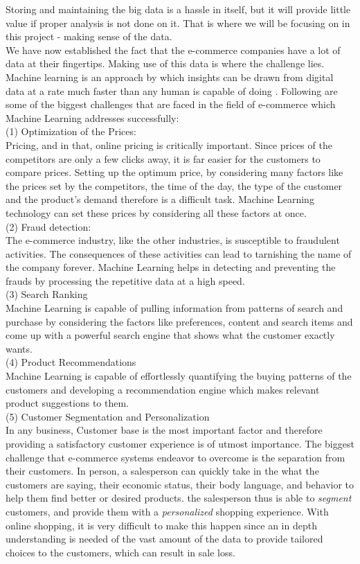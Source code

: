Storing and maintaining the big data is a hassle in itself, but it will provide little value if proper analysis is not done on it. That is where we will be focusing on in this project - making sense of the data.\\
We have now established the fact that the e-commerce companies have a lot of data at their fingertips. Making use of this data is where the challenge lies. Machine learning is an approach by which insights can be drawn from digital data at a rate much faster than any human is capable of doing \cite{link5} . Following are some of the biggest challenges that are faced in the field of e-commerce which Machine Learning addresses successfully:\\
(1) Optimization of the Prices:\\
Pricing, and in that, online pricing is critically important. Since prices of the competitors are only a few clicks away, it is far easier for the customers to compare prices. Setting up the optimum price, by considering many factors like the prices set by the competitors, the time of the day, the type of the customer and the product's demand therefore is a difficult task. Machine Learning technology can set these prices by considering all these factors at once.\\
(2) Fraud detection: \\
The e-commerce industry, like the other industries, is susceptible to fraudulent activities. The consequences of these activities can lead to tarnishing the name of the company forever. Machine Learning helps in detecting and preventing the frauds by processing the repetitive data at a high speed.\\
(3) Search Ranking \\
Machine Learning is capable of pulling information from patterns of search and purchase by considering the factors like preferences, content and search items and come up with a powerful search engine that shows what the customer exactly wants. \\
(4) Product Recommendations \\
Machine Learning is capable of effortlessly quantifying the buying patterns of the customers and developing a recommendation engine which makes relevant product suggestions to them. \\
(5) Customer Segmentation and Personalization \\
In any business, Customer base is the most important factor and therefore providing a satisfactory customer experience is of utmost importance. The biggest challenge that e-commerce systems endeavor to overcome is the separation from their customers. In person, a salesperson can quickly take in the what the customers are saying, their economic status, their body language, and behavior to help them find better or desired products. the salesperson thus is able to \emph{segment} customers, and provide them with a \emph{personalized} shopping experience. With online shopping, it is very difficult to make this happen since an in depth understanding is needed of the vast amount of the data to provide tailored choices to the customers, which can result in sale loss. \\
